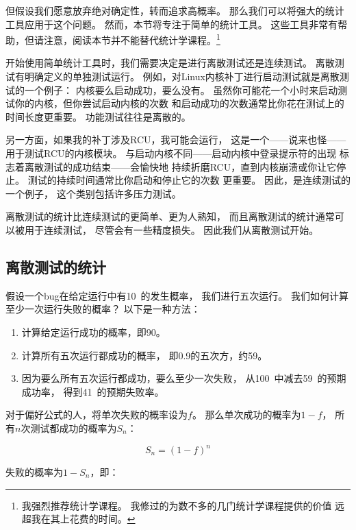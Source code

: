 但假设我们愿意放弃绝对确定性，转而追求高概率。
那么我们可以将强大的统计工具应用于这个问题。
然而，本节将专注于简单的统计工具。
这些工具非常有帮助，但请注意，阅读本节并不能替代统计学课程。\footnote{
	我强烈推荐统计学课程。
	我修过的为数不多的几门统计学课程提供的价值
	远超我在其上花费的时间。}

开始使用简单统计工具时，我们需要决定是进行离散测试还是连续测试。
离散测试有明确定义的单独测试运行。
例如，对Linux内核补丁进行启动测试就是离散测试的一个例子：
内核要么启动成功，要么没有。
虽然你可能花一个小时来启动测试你的内核，但你尝试启动内核的次数
和启动成功的次数通常比你花在测试上的时间长度更重要。
功能测试往往是离散的。

另一方面，如果我的补丁涉及RCU，我可能会运行，
这是一个——说来也怪——用于测试RCU的内核模块。
与启动内核不同——启动内核中登录提示符的出现
标志着离散测试的成功结束——会愉快地
持续折磨RCU，直到内核崩溃或你让它停止。
测试的持续时间通常比你启动和停止它的次数
更重要。
因此，是连续测试的一个例子，
这个类别包括许多压力测试。

离散测试的统计比连续测试的更简单、更为人熟知，
而且离散测试的统计通常可以被用于连续测试，
尽管会有一些精度损失。
因此我们从离散测试开始。

\subsection{离散测试的统计}
\label{sec:debugging:Statistics for Discrete Testing}

假设一个bug在给定运行中有10\pct\ 的发生概率，
我们进行五次运行。
我们如何计算至少一次运行失败的概率？
以下是一种方法：

\begin{enumerate}
\item	计算给定运行成功的概率，即90\pct。
\item	计算所有五次运行都成功的概率，
	即0.9的五次方，约59\pct。
\item	因为要么所有五次运行都成功，要么至少一次失败，
	从100\pct\ 中减去59\pct\ 的预期成功率，
	得到41\pct\ 的预期失败率。
\end{enumerate}

对于偏好公式的人，将单次失败的概率设为$f$。
那么单次成功的概率为$1-f$，
所有$n$次测试都成功的概率为$S_n$：

\begin{equation}
	S_n = \left(1-f\right)^n
\end{equation}

失败的概率为$1-S_n$，即：

